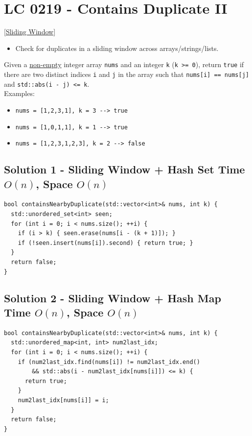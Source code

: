\section{LC 0219 - Contains Duplicate II}\label{lc0219}
{\hyperref[sec:sliding_window]{[Sliding Window]}}

\begin{tcolorbox}
\begin{itemize}
\item Check for duplicates in a sliding window across arrays/strings/lists.
\end{itemize}
\end{tcolorbox}

Given a \ul{non-empty} integer array {\colorbox{CodeBackground}{\lstinline|nums|}} and an integer {\colorbox{CodeBackground}{\lstinline|k|}} ({\colorbox{CodeBackground}{\lstinline|k >= 0|}}), return {\colorbox{CodeBackground}{\lstinline|true|}} if there are two distinct indices {\colorbox{CodeBackground}{\lstinline|i|}} and {\colorbox{CodeBackground}{\lstinline|j|}} in the array such that {\colorbox{CodeBackground}{\lstinline|nums[i] == nums[j]|}} and {\colorbox{CodeBackground}{\lstinline|std::abs(i - j) <= k|}}. \\

Examples:
\begin{itemize}
	\item {\colorbox{CodeBackground}{\lstinline|nums = [1,2,3,1], k = 3 --> true|}}
	\item {\colorbox{CodeBackground}{\lstinline|nums = [1,0,1,1], k = 1 --> true|}}
	\item {\colorbox{CodeBackground}{\lstinline|nums = [1,2,3,1,2,3], k = 2 --> false|}}
\end{itemize}

\subsection*{Solution 1 - Sliding Window + Hash Set {\scriptsize\color{gray}\Coffeecup\hspace{1mm}Time $O(n)$, Space $O(n)$}}
\begin{lstlisting}
bool containsNearbyDuplicate(std::vector<int>& nums, int k) {
  std::unordered_set<int> seen;
  for (int i = 0; i < nums.size(); ++i) {
    if (i > k) { seen.erase(nums[i - (k + 1)]); }
    if (!seen.insert(nums[i]).second) { return true; }
  }
  return false;
}
\end{lstlisting}

\subsection*{Solution 2 - Sliding Window + Hash Map {\scriptsize\color{gray}\Coffeecup\hspace{1mm}Time $O(n)$, Space $O(n)$}}
\begin{lstlisting}
bool containsNearbyDuplicate(std::vector<int>& nums, int k) {
  std::unordered_map<int, int> num2last_idx;
  for (int i = 0; i < nums.size(); ++i) {
    if (num2last_idx.find(nums[i]) != num2last_idx.end()
        && std::abs(i - num2last_idx[nums[i]]) <= k) {
      return true;
    }
    num2last_idx[nums[i]] = i;
  }
  return false;
}
\end{lstlisting}

